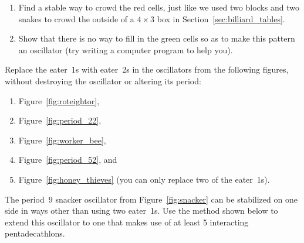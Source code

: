 \begin{multicols}{2}
\begin{problem}
		\begin{center}
		\end{center}
		
		\begin{enumerate}[label=\bf\color{ocre}(\alph*)]
			\item Find a stable way to crowd the red cells, just like we used two blocks and two snakes to crowd the outside of a $4 \times 3$ box in Section~\ref{sec:billiard_tables}.
			
			\item Show that there is no way to fill in the green cells so as to make this pattern an oscillator (try writing a computer program to help you).
		\end{enumerate}
	\end{problem}
	
	
	\mfilbreak
	
	
	\begin{problem}\label{exer:eater_1_replace_eater_2_osc}
		Replace the eater~1s with eater~2s in the oscillators from the following figures, without destroying the oscillator or altering its period:
		
		\begin{enumerate}[label=\bf\color{ocre}(\alph*)]
			\item Figure~\ref{fig:roteightor},
			
			\item Figure~\ref{fig:period_22},
			
			\item Figure~\ref{fig:worker_bee},
			
			\item Figure~\ref{fig:period_52}, and
			
			\item Figure~\ref{fig:honey_thieves} (you can only replace two of the eater~1s). 
		\end{enumerate}
	\end{problem}
	
	
	\mfilbreak
	
	
	\begin{problem}\label{exer:extend_snacker}
		The period~$9$ snacker oscillator from Figure~\ref{fig:snacker} can be stabilized on one side in ways other than using two eater~1s. Use the method shown below to extend this oscillator to one that makes use of at least 5 interacting pentadecathlons.
		
		\begin{center}
		\end{center}
	\end{problem}
	

\end{multicols}
